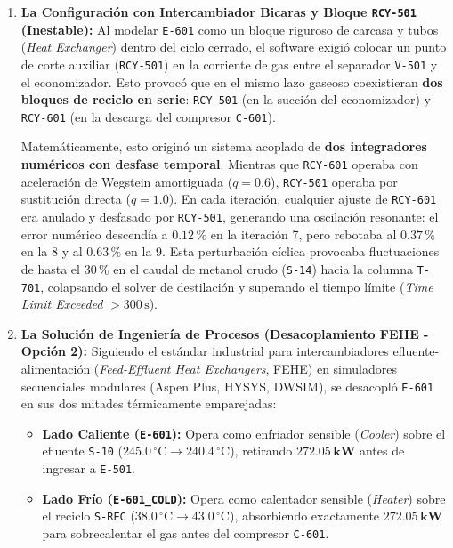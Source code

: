 \documentclass[11pt,a4paper]{article}
\begin{document}
\begin{enumerate}
    \item \textbf{La Configuración con Intercambiador Bicaras y Bloque \texttt{RCY-501} (Inestable):}  
    Al modelar \texttt{E-601} como un bloque riguroso de carcasa y tubos (\textit{Heat Exchanger}) dentro del ciclo cerrado, el software exigió colocar un punto de corte auxiliar (\texttt{RCY-501}) en la corriente de gas entre el separador \texttt{V-501} y el economizador. 
    Esto provocó que en el mismo lazo gaseoso coexistieran \textbf{dos bloques de reciclo en serie}: \texttt{RCY-501} (en la succión del economizador) y \texttt{RCY-601} (en la descarga del compresor \texttt{C-601}).
    
    Matemáticamente, esto originó un sistema acoplado de \textbf{dos integradores numéricos con desfase temporal}. Mientras que \texttt{RCY-601} operaba con aceleración de Wegstein amortiguada ($q = 0.6$), \texttt{RCY-501} operaba por sustitución directa ($q = 1.0$). En cada iteración, cualquier ajuste de \texttt{RCY-601} era anulado y desfasado por \texttt{RCY-501}, generando una oscilación resonante: el error numérico descendía a $0.12\,\%$ en la iteración 7, pero rebotaba al $0.37\,\%$ en la 8 y al $0.63\,\%$ en la 9. 
    Esta perturbación cíclica provocaba fluctuaciones de hasta el $30\,\%$ en el caudal de metanol crudo (\texttt{S-14}) hacia la columna \texttt{T-701}, colapsando el solver de destilación y superando el tiempo límite (\textit{Time Limit Exceeded} $>300\,\text{s}$).

    \item \textbf{La Solución de Ingeniería de Procesos (Desacoplamiento FEHE - Opción 2):}  
    Siguiendo el estándar industrial para intercambiadores efluente-alimentación (\textit{Feed-Effluent Heat Exchangers}, FEHE) en simuladores secuenciales modulares (Aspen Plus, HYSYS, DWSIM), se desacopló \texttt{E-601} en sus dos mitades térmicamente emparejadas:
    \begin{itemize}
        \item \textbf{Lado Caliente (\texttt{E-601}):} Opera como enfriador sensible (\textit{Cooler}) sobre el efluente \texttt{S-10} ($245.0\,^\circ\text{C} \to 240.4\,^\circ\text{C}$), retirando $\mathbf{272.05\,\text{kW}}$ antes de ingresar a \texttt{E-501}.
        \item \textbf{Lado Frío (\texttt{E-601\_COLD}):} Opera como calentador sensible (\textit{Heater}) sobre el reciclo \texttt{S-REC} ($38.0\,^\circ\text{C} \to 43.0\,^\circ\text{C}$), absorbiendo exactamente $\mathbf{272.05\,\text{kW}}$ para sobrecalentar el gas antes del compresor \texttt{C-601}.
    \end{itemize}
    

\end{enumerate}
\end{document}
